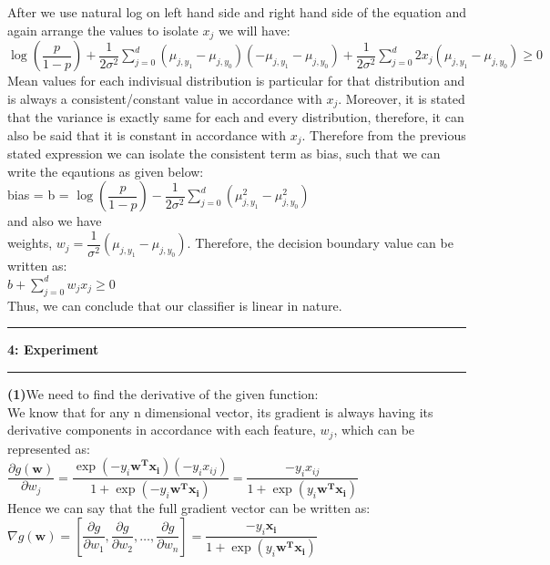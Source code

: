\documentclass[11pt]{article}
\newcommand\question[2]{\vspace{.25in}\hrule\textbf{#1: #2}\vspace{.5em}\hrule\vspace{.10in}}
\renewcommand\part[1]{\vspace{.10in}\textbf{(#1)}}
\begin{document}
After we use natural log on left hand side and right hand side of the equation and again arrange the values to isolate $x_j$ we will have:\\ 
$\log(\dfrac{p}{1-p}) + \dfrac{1}{2\sigma^2}\sum_{j=0}^d (\mu_{j,y_1} - \mu_{j,y_0})(-\mu_{j,y_1} - \mu_{j,y_0}) + \dfrac{1}{2\sigma^2} \sum_{j=0}^d 2x_j (\mu_{j,y_1} - \mu_{j,y_0}) \geq 0$\\
	
Mean values for each indivisual distribution is particular for that distribution and is always a consistent/constant value in accordance with $x_j$. Moreover, it is stated that the variance is exactly same for each and every distribution, therefore, it can also be said that it is constant in accordance with $x_j$. Therefore from the previous stated expression we can isolate the consistent term as bias, such that we can write the eqautions as given below: \\

	bias = b = $\log(\dfrac{p}{1-p}) - \dfrac{1}{2\sigma^2}\sum_{j=0}^d (\mu_{j,y_1}^2 - \mu_{j,y_0}^2)$\\
and also we have\\
	weights, $w_j = \dfrac{1}{\sigma^2}(\mu_{j,y_1} - \mu_{j,y_0})$. \newline
	Therefore, the decision boundary value can be written as:\\
	$b + \sum_{j=0}^d w_jx_j \geq 0$\\
	Thus, we can conclude that our classifier is linear in nature.\\

\question{4}{Experiment}
\part{1}We need to find the derivative of the given function:\\
We know that for any n dimensional vector, its gradient is always having its derivative components in accordance with each feature, $w_j$, which can be represented as:\\

$\dfrac{\partial g(\mathbf{w})}{\partial w_j} = \dfrac{\exp(-y_i\mathbf{w^Tx_i})(-y_ix_{ij})}{1 + \exp(-y_i\mathbf{w^Tx_i})} = \dfrac{-y_ix_{ij}}{1 + \exp(y_i\mathbf{w^Tx_i})}$\\
Hence we can say that the full gradient vector can be written as:\\
$\nabla g(\mathbf{w}) = [\dfrac{\partial g}{\partial w_1},\dfrac{\partial g}{\partial w_2}, \dots, \dfrac{\partial g}{\partial w_n}] = \dfrac{-y_i\mathbf{x_i}}{1 + \exp(y_i\mathbf{w^Tx_i})}$\\
\end{document}
